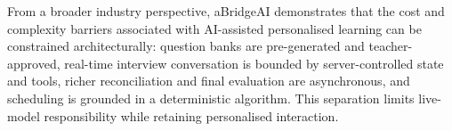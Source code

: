 From a broader industry perspective, aBridgeAI demonstrates that the cost and complexity barriers associated with AI-assisted personalised learning can be constrained architecturally: question banks are pre-generated and teacher-approved, real-time interview conversation is bounded by server-controlled state and tools, richer reconciliation and final evaluation are asynchronous, and scheduling is grounded in a deterministic algorithm. This separation limits live-model responsibility while retaining personalised interaction.